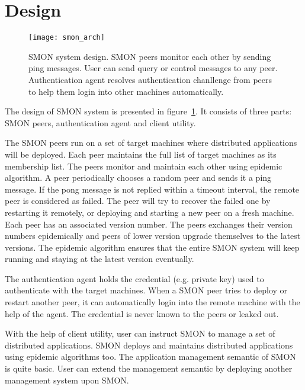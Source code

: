 \section{Design}
\label{sec:design}


\begin{figure}
\centering
\texttt{[image: smon\_arch]}
\caption{SMON system design. SMON peers monitor each
other by sending ping messages. User can send query or control messages
to any peer. Authentication agent resolves authentication
chanllenge from peers to help them login into other machines
automatically.}
\label{fig:smon_arch}
\end{figure}

The design of SMON system is presented in
figure~\ref{fig:smon_arch}.  It consists of three parts: SMON
peers, authentication agent and client utility.

The SMON peers run on a set of target machines where
distributed applications will be deployed. Each peer
maintains the full list of target machines as its membership
list. The peers monitor and maintain each other using
epidemic algorithm. A peer periodically chooses a random
peer and sends it a ping message.  If the pong message is
not replied within a timeout interval, the remote peer is
considered as failed. The peer will try to recover the
failed one by restarting it remotely, or deploying and
starting a new peer on a fresh machine. Each peer has an
associated version number. The peers exchanges their version
numbers epidemically and peers of lower version upgrade
themselves to the latest versions. The epidemic algorithm
ensures that the entire SMON system will keep running and
staying at the latest version eventually.

The authentication agent holds the credential (e.g. private
key) used to authenticate with the target machines. When
a SMON peer tries to deploy or restart another peer, it can
automatically login into the remote machine with the help of
the agent. The credential is never known to the peers or
leaked out.

With the help of client utility, user can instruct SMON to
manage a set of distributed applications. SMON deploys and
maintains distributed applications using epidemic
algorithms too. The application management semantic of SMON
is quite basic. User can extend the management semantic by
deploying another management system upon SMON.



